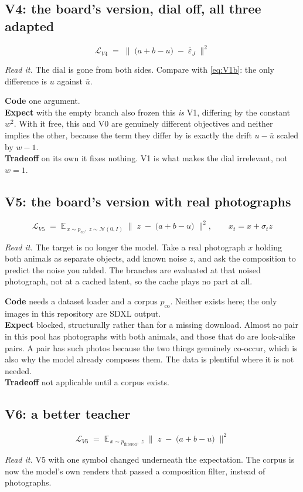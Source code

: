 \documentclass[11pt]{article}
\newcommand{\eps}{\varepsilon}
\newcommand{\B}[1]{\textbf{#1}}
\newcommand{\LL}{\mathcal{L}}
\newcommand{\sq}[1]{\Big\lVert #1 \Big\rVert^2}
\newcommand{\readit}[1]{\par\smallskip\noindent\textit{Read it.} #1}
\begin{document}
\subsection*{V4: the board's version, dial off, all three adapted}
\begin{equation}
  \LL_{V4} \;=\; \sq{\;\big(a + b - u\big) \;-\; \bar\eps_J\;}
\end{equation}
\readit{The dial is gone from both sides. Compare with \eqref{eq:V1b}: the only difference is $u$
against $\bar u$.}

\noindent\B{Code} \quad one argument.\\
\B{Expect} \quad with the empty branch also frozen this \emph{is} V1, differing by the constant
$w^2$. With it free, this and V0 are genuinely different objectives and neither implies the other,
because the term they differ by is exactly the drift $u - \bar u$ scaled by $w-1$.\\
\B{Tradeoff} \quad on its own it fixes nothing. V1 is what makes the dial irrelevant, not $w=1$.

\subsection*{V5: the board's version with real photographs}
\begin{equation}
  \LL_{V5} \;=\; \mathbb{E}_{\,x \sim p_{\text{co}},\; z \sim \mathcal{N}(0,I)}\;
  \sq{\;z \;-\; \big(a + b - u\big)\;},
  \qquad x_t = x + \sigma_t z
\end{equation}
\readit{The target is no longer the model. Take a real photograph $x$ holding both animals as
separate objects, add known noise $z$, and ask the composition to predict the noise you added. The
branches are evaluated at that noised photograph, not at a cached latent, so the cache plays no part
at all.}

\noindent\B{Code} \quad needs a dataset loader and a corpus $p_{\text{co}}$. Neither exists here;
the only images in this repository are SDXL output.\\
\B{Expect} \quad blocked, structurally rather than for a missing download. Almost no pair in this
pool has photographs with both animals, and those that do are look-alike pairs. A pair has such
photos because the two things genuinely co-occur, which is also why the model already composes
them. The data is plentiful where it is not needed.\\
\B{Tradeoff} \quad not applicable until a corpus exists.

\subsection*{V6: a better teacher}
\begin{equation}
  \LL_{V6} \;=\; \mathbb{E}_{\,x \sim p_{\text{filtered}},\; z}\;
  \sq{\;z \;-\; \big(a + b - u\big)\;}
\end{equation}
\readit{V5 with one symbol changed underneath the expectation. The corpus is now the model's own
renders that passed a composition filter, instead of photographs.}
\end{document}
